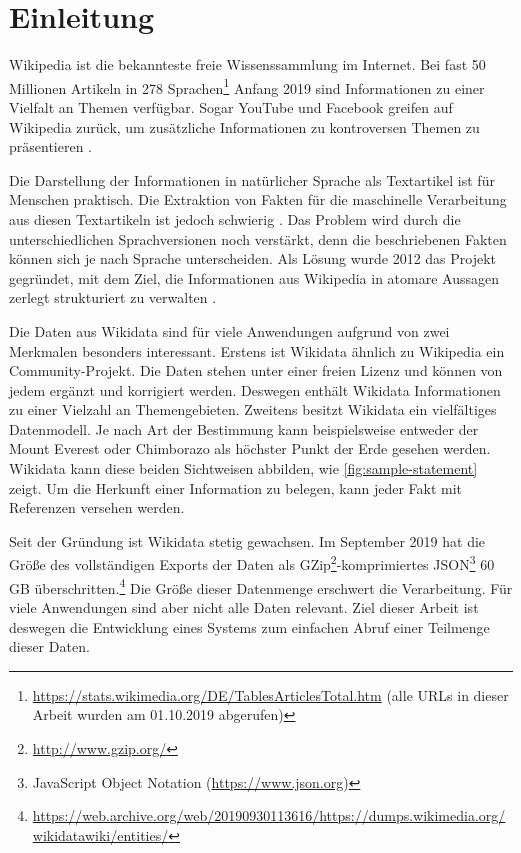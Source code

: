 %
\chapter{Einleitung}
\label{sec:intro}
Wikipedia ist die bekannteste freie Wissenssammlung im Internet.
Bei fast 50 Millionen Artikeln in 278 Sprachen\footnote{\url{https://stats.wikimedia.org/DE/TablesArticlesTotal.htm} (alle URLs in dieser Arbeit wurden am 01.10.2019 abgerufen)} Anfang 2019 sind Informationen zu einer Vielfalt an Themen verfügbar.
Sogar YouTube und Facebook greifen auf Wikipedia zurück, um zusätzliche Informationen zu kontroversen Themen zu präsentieren \cite{youtube-facebook-wp}.

Die Darstellung der Informationen in natürlicher Sprache als Textartikel ist für Menschen praktisch.
Die Extraktion von Fakten für die maschinelle Verarbeitung aus diesen Textartikeln ist jedoch schwierig \cite{oie-errors,extract-rel-ibm}.
Das Problem wird durch die unterschiedlichen Sprachversionen noch verstärkt, denn die beschriebenen Fakten können sich je nach Sprache unterscheiden.
Als Lösung wurde 2012 das Projekt  gegründet, mit dem Ziel, die Informationen aus Wikipedia in atomare Aussagen zerlegt strukturiert zu verwalten \cite{wikidata}.

Die Daten aus Wikidata sind für viele Anwendungen aufgrund von zwei Merkmalen besonders interessant.
Erstens ist Wikidata ähnlich zu Wikipedia ein Community-Projekt.
Die Daten stehen unter einer freien Lizenz und können von jedem ergänzt und korrigiert werden.
Deswegen enthält Wikidata Informationen zu einer Vielzahl an Themengebieten.
Zweitens besitzt Wikidata ein vielfältiges Datenmodell.
Je nach Art der Bestimmung kann beispielsweise entweder der Mount Everest oder Chimborazo als höchster Punkt der Erde gesehen werden.
Wikidata kann diese beiden Sichtweisen abbilden, wie \cref{fig:sample-statement} zeigt.
Um die Herkunft einer Information zu belegen, kann jeder Fakt mit Referenzen versehen werden.

Seit der Gründung ist Wikidata stetig gewachsen.
Im September 2019 hat die Größe des vollständigen Exports der Daten als GZip\footnote{\url{http://www.gzip.org/}}-komprimiertes JSON\footnote{JavaScript Object Notation (\url{https://www.json.org})} 60 GB überschritten.\footnote{\url{https://web.archive.org/web/20190930113616/https://dumps.wikimedia.org/wikidatawiki/entities/}}
Die Größe dieser Datenmenge erschwert die Verarbeitung.
Für viele Anwendungen sind aber nicht alle Daten relevant.
Ziel dieser Arbeit ist deswegen die Entwicklung eines Systems zum einfachen Abruf einer Teilmenge dieser Daten.

